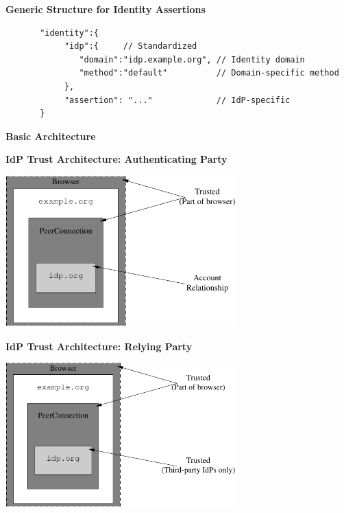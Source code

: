 \documentclass[helvetica]{seminar}
\newcommand{\heading}[1]{%
  \begin{center} 
    \large\bf 
    #1 
  \end{center} 
  \vspace{.4 in}}
\begin{document}
\begin{slide}
\heading{Generic Structure for Identity Assertions}

\begin{small}
\begin{verbatim}
       "identity":{
            "idp":{     // Standardized
               "domain":"idp.example.org", // Identity domain
               "method":"default"          // Domain-specific method
            },
            "assertion": "..."             // IdP-specific
       }
\end{verbatim}
\end{small}
\end{slide}


\begin{slide}
\heading{Basic Architecture}

\end{slide}


\begin{slide}
\heading{IdP Trust Architecture: Authenticating Party}

\begin{center}
\includegraphics[width=3.5in]{rtcweb-security-arch-idp}
\end{center}

\end{slide}

\begin{slide}
\heading{IdP Trust Architecture: Relying Party}

\begin{center}
\includegraphics[width=3.5in]{rtcweb-security-arch-idp2}
\end{center}
\end{slide}
\end{document}
